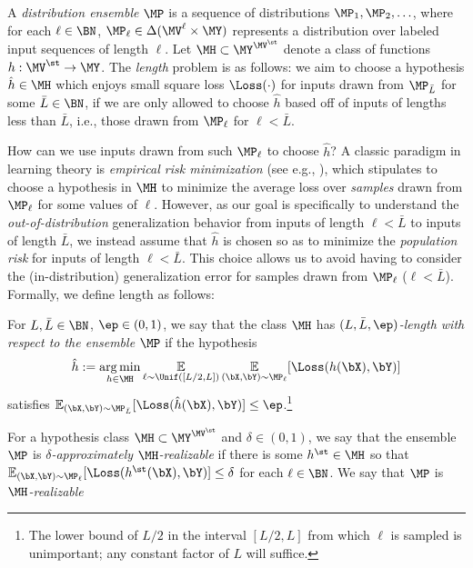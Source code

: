 \documentclass{article}
\newcommand{\arxiv}[1]{\iftoggle{icml}{}{#1}}
\newcommand{\icml}[1]{\iftoggle{icml}{#1}{}}
\begin{document}
A \emph{distribution ensemble} $\MP$ is a sequence of distributions $\MP_1, \MP_2, \ldots$, where for each $\ell \in \BN$, $\MP_\ell \in \Delta(\MV^\ell \times \MY)$ represents a distribution over labeled input sequences of length $\ell$.  %
Let $\MH \subset \MY^{\MV^\st}$ denote a class of functions $h : \MV^\st \to \MY$. The \emph{length \generalization} problem is as follows: we aim to choose a hypothesis $\hat h \in \MH$ which enjoys small square loss $\Loss(\cdot)$ for inputs drawn from $\MP_{\bar L}$ for some $\bar L \in \BN$, if we are only allowed to choose $\hat h$ based off of inputs of lengths less than $\bar L$, i.e., those drawn from $\MP_\ell$ for $\ell < \bar L$.

How can we use inputs drawn from such $\MP_\ell$ to choose $\hat h$? A classic paradigm in learning theory is \emph{empirical risk minimization} (see e.g., \citet{shalev_understanding_2014}), which stipulates to choose a hypothesis in $\MH$ to minimize the average loss over \emph{samples} drawn from $\MP_\ell$ for some values of $\ell$. However, as our goal is specifically to understand the \emph{out-of-distribution} generalization behavior from  inputs of length $\ell < \bar L$ to inputs of length $\bar L$, we instead assume that $\hat h$ is chosen so as to minimize the \emph{population risk} for inputs of length $\ell < \bar L$. This choice allows us to avoid having to consider the (in-distribution) generalization error for samples drawn from $\MP_\ell$ ($\ell < \bar L$). 
Formally, we define length \generalization as follows: 
\begin{definition}
  \label{def:length-extrap}
  For $L,\bar L \in \BN$, $ \ep \in (0,1)$, we say that the class $\MH$ has \emph{$(L,\bar L,\ep)$-length \generalization with respect to the ensemble $\MP$} %
  if the hypothesis %
  \begin{align}
\hat h := \argmin_{h \in \MH} \E_{\ell \sim \Unif([L/2, L])} \E_{(\bX, \bY) \sim \MP_\ell} [\Loss(h(\bX), \bY)]\label{eq:define-hath} 
  \end{align}
  satisfies $\E_{(\bX, \bY) \sim \MP_{\bar L}}[\Loss(\hat h(\bX), \bY)] \leq \ep$.\footnote{The lower bound of $L/2$ in the interval $[L/2,L]$ from which $\ell$ is sampled is unimportant; any constant factor of $L$ will suffice.}
\end{definition}
For a hypothesis class $\MH \subset \MY^{\MV^\st}$ and $\delta \in (0,1)$, we say that the ensemble $\MP$ is \emph{$\delta$-approximately $\MH$-realizable} if there is some $h^\st \in \MH$ so that $\E_{(\bX, \bY) \sim \MP_\ell}[\Loss(h^\st(\bX), \bY)] \leq \delta$ for each $\ell \in \BN$. We say that $\MP$ is \emph{$\MH$-realizable} \icml{in the case $\delta = 0$.}\arxiv{if it is 0-approximately $\MH$-realizable.} %
\end{document}
